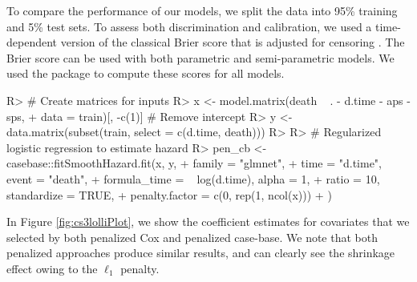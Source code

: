 \documentclass[
]{jss}
\begin{document}
To compare the performance of our models, we split the data into 95\%
training and 5\% test sets. To assess both discrimination and
calibration, we used a time-dependent version of the classical Brier
score that is adjusted for censoring \citep{graf1999ass}. The Brier
score can be used with both parametric and semi-parametric models. We
used the  package to compute these scores for all
models.

\begin{CodeChunk}

\begin{CodeInput}
R> # Create matrices for inputs
R> x <- model.matrix(death ~ . - d.time - aps - sps, 
+                   data = train)[, -c(1)] # Remove intercept
R> y <- data.matrix(subset(train, select = c(d.time, death)))
R> 
R> # Regularized logistic regression to estimate hazard
R> pen_cb <- casebase::fitSmoothHazard.fit(x, y,
+   family = "glmnet",
+   time = "d.time", event = "death",
+   formula_time = ~ log(d.time), alpha = 1,
+   ratio = 10, standardize = TRUE,
+   penalty.factor = c(0, rep(1, ncol(x)))
+ )
\end{CodeInput}
\end{CodeChunk}

In Figure \ref{fig:cs3lolliPlot}, we show the coefficient estimates for
covariates that we selected by both penalized Cox and penalized
case-base. We note that both penalized approaches produce similar
results, and can clearly see the shrinkage effect owing to the
\(\ell_1\) penalty.
\end{document}
